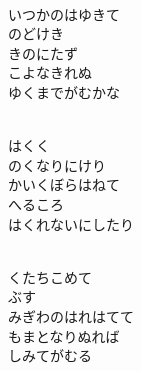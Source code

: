 \documentclass[10pt,b5j]{tarticle} %
\begin{document}
\begin{enumerate}
\begin{minipage}[c]{\blocksize}
    \end{minipage}
    \begin{minipage}[c]{\blocksize}
        
        \vspace{\linespace}
        \item~\\
        いつかのはゆきて\\
        のどけき\\
        きのにたず\\
        こよなきれぬ\\
        ゆくまでがむかな
        
    \end{minipage}
    \begin{minipage}[c]{\blocksize}
        
        \vspace{\linespace}
        \item~\\
        はくく\\
        のくなりにけり\\
        かいくぼらはねて\\
        へるころ\\
        はくれないにしたり
        
    \end{minipage}
    \begin{minipage}[c]{\blocksize}
        
        \vspace{\linespace}
        \item~\\
        くたちこめて\\
        ぶす\\
        みぎわのはれはてて\\
        もまとなりぬれば\\
        しみてがむる
        

\end{minipage}
\end{enumerate}
\end{document}
